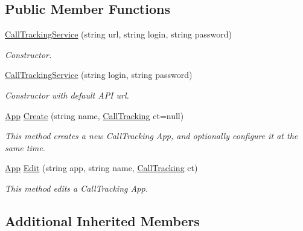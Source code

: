 \subsection*{Public Member Functions}
\begin{DoxyCompactItemize}
\item 
\hyperlink{class_thecallr_api_1_1_services_1_1_client_1_1_call_tracking_service_aeb6a8618a7f57e4db5ac04ddb2769f87}{Call\+Tracking\+Service} (string url, string login, string password)
\begin{DoxyCompactList}\small\item\em Constructor. \end{DoxyCompactList}\item 
\hyperlink{class_thecallr_api_1_1_services_1_1_client_1_1_call_tracking_service_a943d1050964d33e7fd55646999e218c9}{Call\+Tracking\+Service} (string login, string password)
\begin{DoxyCompactList}\small\item\em Constructor with default A\+P\+I url. \end{DoxyCompactList}\item 
\hyperlink{class_thecallr_api_1_1_objects_1_1_app_1_1_app}{App} \hyperlink{class_thecallr_api_1_1_services_1_1_client_1_1_call_tracking_service_a0a687d6a2f4135f53792a4b5e6733203}{Create} (string name, \hyperlink{class_thecallr_api_1_1_objects_1_1_call_tracking_1_1_call_tracking}{Call\+Tracking} ct=null)
\begin{DoxyCompactList}\small\item\em This method creates a new Call\+Tracking App, and optionally configure it at the same time. \end{DoxyCompactList}\item 
\hyperlink{class_thecallr_api_1_1_objects_1_1_app_1_1_app}{App} \hyperlink{class_thecallr_api_1_1_services_1_1_client_1_1_call_tracking_service_add0083efd720abdc246b1ada3507853c}{Edit} (string app, string name, \hyperlink{class_thecallr_api_1_1_objects_1_1_call_tracking_1_1_call_tracking}{Call\+Tracking} ct)
\begin{DoxyCompactList}\small\item\em This method edits a Call\+Tracking App. \end{DoxyCompactList}\end{DoxyCompactItemize}
\subsection*{Additional Inherited Members}


